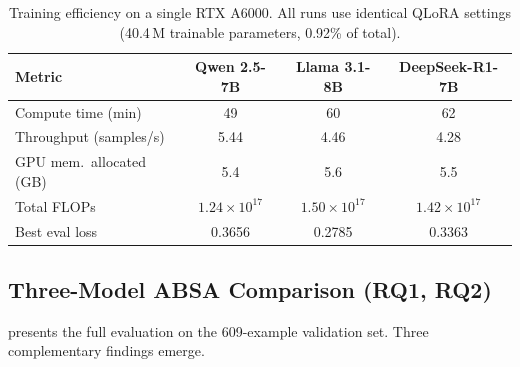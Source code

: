 \documentclass[runningheads]{llncs}
\begin{document}
\begin{table}[t]
\centering
\caption{Training efficiency on a single RTX A6000. All runs use identical QLoRA settings (40.4\,M trainable parameters, 0.92\% of total).}
\label{tab:train_efficiency}
\setlength{\tabcolsep}{4pt}
\begin{tabular}{lccc}
\toprule
\textbf{Metric} & \textbf{Qwen 2.5-7B} & \textbf{Llama 3.1-8B} & \textbf{DeepSeek-R1-7B} \\
\midrule
Compute time (min)       & 49   & 60   & 62   \\
Throughput (samples/s)   & 5.44 & 4.46 & 4.28 \\
GPU mem.\ allocated (GB) & 5.4  & 5.6  & 5.5  \\
Total FLOPs              & $1.24\!\times\!10^{17}$ & $1.50\!\times\!10^{17}$ & $1.42\!\times\!10^{17}$ \\
Best eval loss           & 0.3656 & 0.2785 & 0.3363 \\
\bottomrule
\end{tabular}
\end{table}

\subsection{Three-Model ABSA Comparison (RQ1, RQ2)}
\label{sec:res_comparison}

 presents the full evaluation on the 609-example validation set. Three complementary findings emerge.
\end{document}
